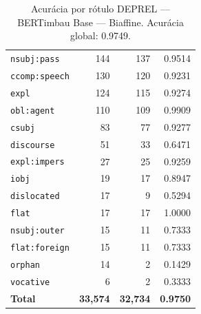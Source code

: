 \begin{table}[ht]
\begin{tabular}{lrrr}
\texttt{nsubj\!:\!pass} & 144 & 137 & 0.9514 \\
\texttt{ccomp\!:\!speech} & 130 & 120 & 0.9231 \\
\texttt{expl} & 124 & 115 & 0.9274 \\
\texttt{obl\!:\!agent} & 110 & 109 & 0.9909 \\
\texttt{csubj} & 83 & 77 & 0.9277 \\
\texttt{discourse} & 51 & 33 & 0.6471 \\
\texttt{expl\!:\!impers} & 27 & 25 & 0.9259 \\
\texttt{iobj} & 19 & 17 & 0.8947 \\
\texttt{dislocated} & 17 & 9 & 0.5294 \\
\texttt{flat} & 17 & 17 & 1.0000 \\
\texttt{nsubj\!:\!outer} & 15 & 11 & 0.7333 \\
\texttt{flat\!:\!foreign} & 15 & 11 & 0.7333 \\
\texttt{orphan} & 14 & 2 & 0.1429 \\
\texttt{vocative} & 6 & 2 & 0.3333 \\
\midrule
\textbf{Total} & \textbf{33,574} & \textbf{32,734} & \textbf{0.9750} \\
\bottomrule
\end{tabular}
\caption{Acurácia por rótulo DEPREL — BERTimbau Base — Biaffine. Acurácia global: 0.9749.}
\label{tab:deprel-acc-predict-test-df-bertimbau-base-biaffine}
\end{table}

